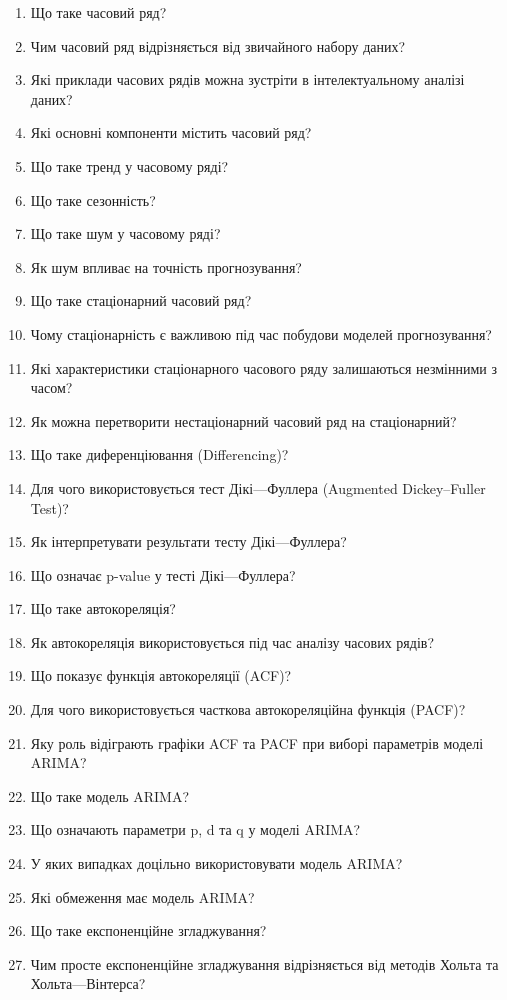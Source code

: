 \begin{enumerate}
\item Що таке часовий ряд?
\item Чим часовий ряд відрізняється від звичайного набору даних?
\item Які приклади часових рядів можна зустріти в інтелектуальному аналізі даних?
\item Які основні компоненти містить часовий ряд?
\item Що таке тренд у часовому ряді?
\item Що таке сезонність?
\item Що таке шум у часовому ряді?
\item Як шум впливає на точність прогнозування?
\item Що таке стаціонарний часовий ряд?
\item Чому стаціонарність є важливою під час побудови моделей прогнозування?
\item Які характеристики стаціонарного часового ряду залишаються незмінними з часом?
\item Як можна перетворити нестаціонарний часовий ряд на стаціонарний?
\item Що таке диференціювання (Differencing)?
\item Для чого використовується тест Дікі—Фуллера (Augmented Dickey–Fuller Test)?
\item Як інтерпретувати результати тесту Дікі—Фуллера?
\item Що означає p-value у тесті Дікі—Фуллера?
\item Що таке автокореляція?
\item Як автокореляція використовується під час аналізу часових рядів?
\item Що показує функція автокореляції (ACF)?
\item Для чого використовується часткова автокореляційна функція (PACF)?
\item Яку роль відіграють графіки ACF та PACF при виборі параметрів моделі ARIMA?
\item Що таке модель ARIMA?
\item Що означають параметри p, d та q у моделі ARIMA?
\item У яких випадках доцільно використовувати модель ARIMA?
\item Які обмеження має модель ARIMA?
\item Що таке експоненційне згладжування?
\item Чим просте експоненційне згладжування відрізняється від методів Хольта та Хольта—Вінтерса?

\end{enumerate}
